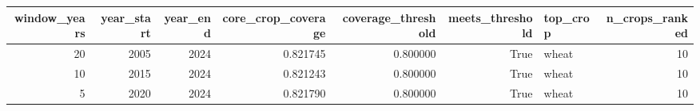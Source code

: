 \begin{tabular}{rrrrrrlr}
\toprule
window\_years & year\_start & year\_end & core\_crop\_coverage & coverage\_threshold & meets\_threshold & top\_crop & n\_crops\_ranked \\
\midrule
20 & 2005 & 2024 & 0.821745 & 0.800000 & True & wheat & 10 \\
10 & 2015 & 2024 & 0.821243 & 0.800000 & True & wheat & 10 \\
5 & 2020 & 2024 & 0.821790 & 0.800000 & True & wheat & 10 \\
\bottomrule
\end{tabular}
